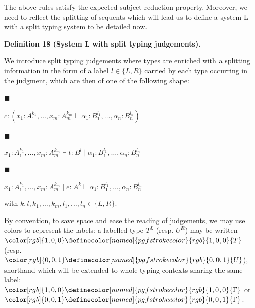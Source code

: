 \documentclass[10pt,a4paper]{article}
\begin{document}
The above rules satisfy the expected subject reduction property. Moreover, we need to reflect the splitting of sequents which will lead us to define a system L with a split typing system to be detailed now.\par
 
 
 
\par\medskip\noindent\textbf{Definition 18 (System L with split typing judgements).}\par
 
 
We introduce split typing judgements where types are enriched with a splitting information in the form of a label $l\in\{L,R\}$ carried by each type occurring in the judgment, which are then of one of the following shape:\par
  
\par\noindent  $\blacksquare$ 
 
$c:(x_{1}:A_{1}^{k_{1}},\dots,x_{m}:A_{m}^{k_{m}}\vdash\alpha_{1}:B_{1}^{l_{1}},\dots,\alpha_{n}:B_{n}^{l_{n}})$\par
 
 
 
\par\noindent  $\blacksquare$ 
 
$x_{1}:A_{1}^{k_{1}},\dots,x_{m}:A_{m}^{k_{m}}\vdash t:B^{l}\mid\alpha_{1}:B_{1}^{l_{1}},\dots,\alpha_{n}:B_{n}^{l_{n}}$\par
 
 
 
\par\noindent  $\blacksquare$ 
 
$x_{1}:A_{1}^{k_{1}},\dots,x_{m}:A_{m}^{k_{m}}\mid e:A^{k}\vdash\alpha_{1}:B_{1}^{l_{1}},\dots,\alpha_{n}:B_{n}^{l_{n}}$\par
 
 
  
with $k,l,k_{1},\dots,k_{m},l_{1},\dots,l_{n}\in\{L,R\}$.\par
 
 
 
By convention, to save space and ease the reading of judgements, we may use colors to represent the labels: a labelled type $T^{L}$ (resp. $U^{R}$) may be written ${\color[rgb]{1,0,0}\definecolor[named]{pgfstrokecolor}{rgb}{1,0,0}{{T}}}$ (resp. ${\color[rgb]{0,0,1}\definecolor[named]{pgfstrokecolor}{rgb}{0,0,1}{{U}}}$), shorthand which will be extended to whole typing contexts sharing the same label: ${\color[rgb]{1,0,0}\definecolor[named]{pgfstrokecolor}{rgb}{1,0,0}{{\Gamma}}}$ or ${\color[rgb]{0,0,1}\definecolor[named]{pgfstrokecolor}{rgb}{0,0,1}{{\Gamma}}}$.\par
 
\end{document}
